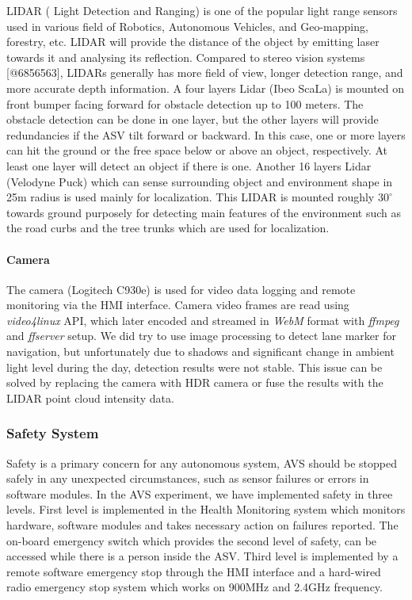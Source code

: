 \documentclass[10 pt,a4paper,conference]{IEEEtran}
\begin{document}
LIDAR ( Light Detection and Ranging) is one of the popular light range
sensors used in various field of Robotics, Autonomous Vehicles, and
Geo-mapping, forestry, etc. LIDAR will provide the distance of the
object by emitting laser towards it and analysing its reflection.
Compared to stereo vision systems {[}@6856563{]}, LIDARs generally has
more field of view, longer detection range, and more accurate depth
information. A four layers Lidar (Ibeo ScaLa) is mounted on front bumper
facing forward for obstacle detection up to 100 meters. The obstacle
detection can be done in one layer, but the other layers will provide
redundancies if the ASV tilt forward or backward. In this case, one or
more layers can hit the ground or the free space below or above an
object, respectively. At least one layer will detect an object if there
is one. Another 16 layers Lidar (Velodyne Puck) which can sense
surrounding object and environment shape in 25m radius is used mainly
for localization. This LIDAR is mounted roughly $30^{\circ}$ towards
ground purposely for detecting main features of the environment such as
the road curbs and the tree trunks which are used for localization.

\paragraph{Camera}\label{camera}

The camera (Logitech C930e) is used for video data logging and remote
monitoring via the HMI interface. Camera video frames are read using
\emph{video4linux} API, which later encoded and streamed in \emph{WebM}
format with \emph{ffmpeg} and \emph{ffserver} setup. We did try to use
image processing to detect lane marker for navigation, but unfortunately
due to shadows and significant change in ambient light level during the
day, detection results were not stable. This issue can be solved by
replacing the camera with HDR camera or fuse the results with the LIDAR
point cloud intensity data.

\subsubsection{Safety System}\label{safety-system}

Safety is a primary concern for any autonomous system, AVS should be
stopped safely in any unexpected circumstances, such as sensor failures
or errors in software modules. In the AVS experiment, we have
implemented safety in three levels. First level is implemented in the
Health Monitoring system which monitors hardware, software modules and
takes necessary action on failures reported. The on-board emergency
switch which provides the second level of safety, can be accessed while
there is a person inside the ASV. Third level is implemented by a remote
software emergency stop through the HMI interface and a hard-wired radio
emergency stop system which works on 900MHz and 2.4GHz frequency.
\end{document}
